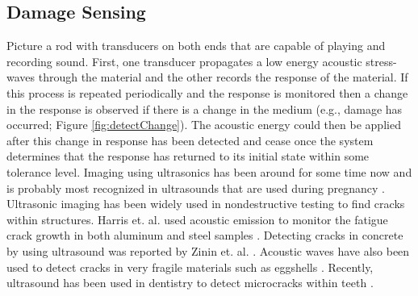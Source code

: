 \subsection{Damage Sensing}

Picture a rod with transducers on both ends that are capable of playing and recording sound. First, one transducer propagates a low energy acoustic stress-waves through the material and the other records the response of the material. If this process is repeated periodically and the response is monitored then a change in the response is observed if there is a change in the medium (e.g., damage has occurred; Figure \ref{fig:detectChange}). The acoustic energy could then be applied after this change in response has been detected and cease once the system determines that the response has returned to its initial state within some tolerance level. Imaging using ultrasonics has been around for some time now and is probably most recognized in ultrasounds that are used during pregnancy \cite{Ultrasound2006}. Ultrasonic imaging has been widely used in nondestructive testing to find cracks within structures. Harris et. al. used acoustic emission to monitor the fatigue crack growth in both aluminum and steel samples \cite{Harris1974}. Detecting cracks in concrete by using ultrasound was reported by Zinin et. al. \cite{Zinin2000}. Acoustic waves have also been used to detect cracks in very fragile materials such as eggshells \cite{DeKetelaere2000}. Recently, ultrasound has been used in dentistry to detect microcracks within teeth \cite{Matsushita2012}.

